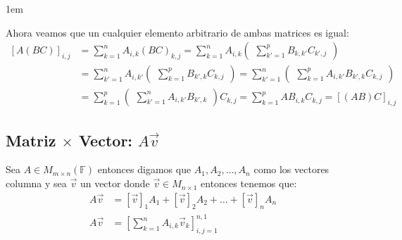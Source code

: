 \documentclass[12pt]{report}                                    %
\newenvironment{SmallIndentation}[1][0.75em]                    %
    {\begin{adjustwidth}{#1}{}\begin{footnotesize}}                 %
    {\end{footnotesize}\end{adjustwidth}}                           %
\newcommand{\pVector}[1]{                                       %
        \ensuremath{\begin{pmatrix}#1\end{pmatrix}}                 %
    }
\newcommand{\Brackets}[1]{\left[ #1 \right]}                    %
\begin{document}
\begin{itemize}
\begin{SmallIndentation}[1em]
                            Ahora veamos que un cualquier elemento arbitrario de ambas matrices es igual:
                            \begin{equation*}
                            \begin{split}
                                [A(BC)]_{i, j}    
                                    &= \sum_{k=1}^n A_{i, k} (BC)_{k, j}  
                                     = \sum_{k=1}^n A_{i, k} \pVector{\sum_{k'=1}^p B_{k, k'} C_{k', j} }   \\
                                    &= \sum_{k'=1}^n A_{i, k'} \pVector{\sum_{k=1}^p B_{k', k} C_{k, j} }   
                                     = \sum_{k'=1}^n \pVector{\sum_{k=1}^p A_{i, k'} B_{k', k} C_{k, j} }   \\
                                    &= \sum_{k=1}^p \pVector{\sum_{k'=1}^n A_{i,k'} B_{k',k} } C_{k, j}  
                                     = \sum_{k=1}^p AB_{i, k} C_{k, j}
                                     = [(AB)C]_{i, j}
                            \end{split}
                            \end{equation*}

                        \end{SmallIndentation}

                \end{itemize}




            \clearpage
            \subsection{Matriz $\times$ Vector: $A\vec{v}$}
                Sea $A \in M_{m \times n}(\mathbb{F})$ entonces digamos que $A_1, A_2, \dots, A_n$ como
                los vectores columna y sea $\vec{v}$ un vector donde $\vec{v} \in M_{n \times 1}$
                entonces tenemos que:
                \begin{equation}
                \begin{split}
                    A\vec{v} &= [\vec{v}]_1 A_1 + [\vec{v}]_2 A_2 + \dots + [\vec{v}]_n A_n     \\
                    A\vec{v} &= \Brackets{ \sum_{k=1}^{n}A_{i, k} \vec{v}_k }_{i, j = 1}^{n, 1}
                \end{split}
                \end{equation}
\end{document}

